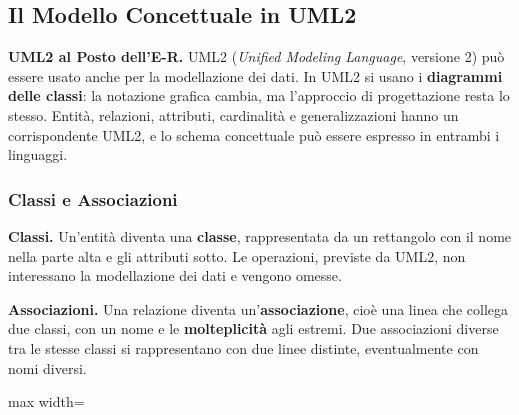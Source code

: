 \documentclass[12pt]{extarticle}
\begin{document}
\subsection{Il Modello Concettuale in UML2}

\noindent \textbf{UML2 al Posto dell'E-R.} UML2 (\textit{Unified Modeling Language}, versione 2) può essere usato anche per la modellazione dei dati. In UML2 si usano i \textbf{diagrammi delle classi}: la notazione grafica cambia, ma l'approccio di progettazione resta lo stesso. Entità, relazioni, attributi, cardinalità e generalizzazioni hanno un corrispondente UML2, e lo schema concettuale può essere espresso in entrambi i linguaggi.

\subsubsection{Classi e Associazioni}

\noindent \textbf{Classi.} Un'entità diventa una \textbf{classe}, rappresentata da un rettangolo con il nome nella parte alta e gli attributi sotto. Le operazioni, previste da UML2, non interessano la modellazione dei dati e vengono omesse.

\medskip
\noindent \textbf{Associazioni.} Una relazione diventa un'\textbf{associazione}, cioè una linea che collega due classi, con un nome e le \textbf{molteplicità} agli estremi. Due associazioni diverse tra le stesse classi si rappresentano con due linee distinte, eventualmente con nomi diversi.

\begin{center}
\begin{adjustbox}{max width=\linewidth}
\end{adjustbox}
\end{center}
\end{document}
